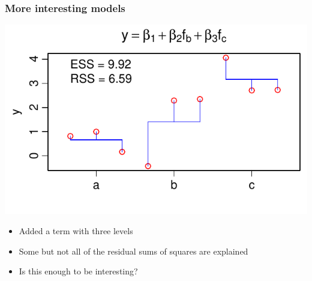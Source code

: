 \documentclass[aspectratio=43]{beamer}
\begin{document}
\begin{frame}[T]
\frametitle{More interesting models}


		\centerline{\includegraphics[height=0.5\textheight]{Intermediate.pdf}}

		\begin{itemize}
		\item Added a term with three levels
		\item Some but not all of the residual sums of squares are explained
		\item Is this enough to be interesting?
		\end{itemize}		

\end{frame}
\end{document}
